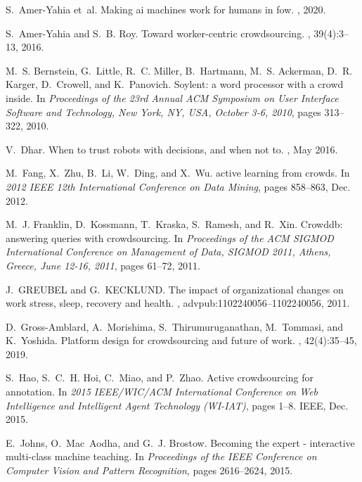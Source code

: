 \documentclass[11pt]{article}
\begin{document}
\begin{thebibliography}{10}
	
	S.~Amer-Yahia et~al.
	\newblock Making ai machines work for humans in fow.
	, 2020.
	
	S.~Amer{-}Yahia and S.~B. Roy.
	\newblock Toward worker-centric crowdsourcing.
	, 39(4):3--13, 2016.
	
	M.~S. Bernstein, G.~Little, R.~C. Miller, B.~Hartmann, M.~S. Ackerman, D.~R.
	Karger, D.~Crowell, and K.~Panovich.
	\newblock Soylent: a word processor with a crowd inside.
	\newblock In {\em Proceedings of the 23rd Annual {ACM} Symposium on User
		Interface Software and Technology, New York, NY, USA, October 3-6, 2010},
	pages 313--322, 2010.
	
	V.~Dhar.
	\newblock When to trust robots with decisions, and when not to.
	, May 2016.
	
	M.~Fang, X.~Zhu, B.~Li, W.~Ding, and X.~Wu.
	 active learning from crowds.
	\newblock In {\em 2012 {IEEE} 12th International Conference on Data Mining},
	pages 858--863, Dec. 2012.
	
	M.~J. Franklin, D.~Kossmann, T.~Kraska, S.~Ramesh, and R.~Xin.
	\newblock Crowddb: answering queries with crowdsourcing.
	\newblock In {\em Proceedings of the {ACM} {SIGMOD} International Conference on
		Management of Data, {SIGMOD} 2011, Athens, Greece, June 12-16, 2011}, pages
	61--72, 2011.
	
	J.~GREUBEL and G.~KECKLUND.
	\newblock The impact of organizational changes on work stress, sleep, recovery
	and health.
	, advpub:1102240056--1102240056, 2011.
	
	D.~Gross{-}Amblard, A.~Morishima, S.~Thirumuruganathan, M.~Tommasi, and
	K.~Yoshida.
	\newblock Platform design for crowdsourcing and future of work.
	, 42(4):35--45, 2019.
	
	S.~Hao, S.~C.~H. Hoi, C.~Miao, and P.~Zhao.
	\newblock Active crowdsourcing for annotation.
	\newblock In {\em 2015 {IEEE/WIC/ACM} International Conference on Web
		Intelligence and Intelligent Agent Technology ({WI-IAT})}, pages 1--8. IEEE,
	Dec. 2015.
	
	E.~Johns, O.~Mac~Aodha, and G.~J. Brostow.
	\newblock Becoming the expert - interactive multi-class machine teaching.
	\newblock In {\em Proceedings of the {IEEE} Conference on Computer Vision and
		Pattern Recognition}, pages 2616--2624, 2015.
	

\end{thebibliography}
\end{document}
